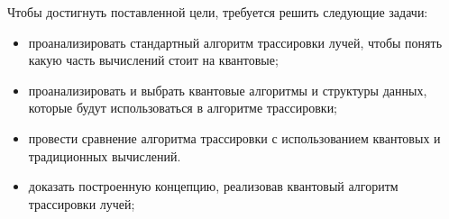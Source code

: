 Чтобы достигнуть поставленной цели, требуется решить следующие задачи:

\begin{itemize}
    \item проанализировать стандартный алгоритм трассировки лучей, чтобы
понять какую часть вычислений стоит на квантовые;
    \item проанализировать и выбрать квантовые алгоритмы и структуры данных, которые будут использоваться в алгоритме трассировки;
    \item провести сравнение алгоритма трассировки с использованием квантовых и традиционных вычислений.
    \item доказать построенную концепцию, реализовав квантовый алгоритм трассировки лучей;
\end{itemize}
